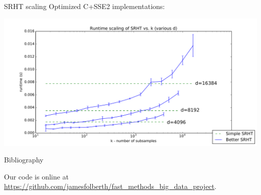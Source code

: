 \documentclass[9pt]{beamer}
\begin{document}
\begin{frame}{SRHT scaling}
   Optimized C+SSE2 implementations:\\

   \begin{center}
      \includegraphics[width=\textwidth]{figures/srht_C_k_scaling.pdf}
   \end{center}
\end{frame}


\begin{frame}[allowframebreaks]{Bibliography}
   
   Our code is online at\\
   {\small\url{https://github.com/jamesfolberth/fast_methods_big_data_project}}.\\




\end{frame}
\end{document}
